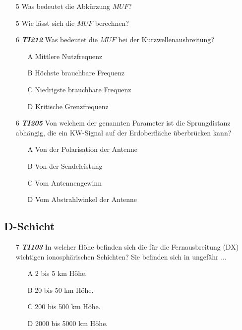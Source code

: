 \begin{enumerate} 
\itemsep1pt\parskip0pt
\item[5] Was bedeutet die Abkürzung $MUF$? 
\item[5] Wie lässt sich die $MUF$ berechnen? 
\item[6] \emph{\textbf{TI212}}   Was bedeutet die $MUF$ bei der Kurzwellenausbreitung?
	\begin{enumerate}
	\itemsep1pt\parskip0pt
		\item[A] Mittlere Nutzfrequenz
		\item[B] Höchste brauchbare Frequenz
		\item[C] Niedrigste brauchbare Frequenz
		\item[D] Kritische Grenzfrequenz
	\end{enumerate}
\end{enumerate}

\begin{enumerate} 
\itemsep1pt\parskip0pt
\item[6] \emph{\textbf{TI205}}   Von welchem der genannten Parameter ist die Sprungdistanz abhängig, die ein KW-Signal auf der Erdoberfläche überbrücken kann?
	\begin{enumerate}
	\itemsep1pt\parskip0pt
		\item[A] Von der Polarisation der Antenne
		\item[B] Von der Sendeleistung
		\item[C] Vom Antennengewinn
		\item[D] Vom Abstrahlwinkel der Antenne
	\end{enumerate}
\end{enumerate}

\subsection*{D-Schicht}

\begin{enumerate} 
\itemsep1pt\parskip0pt
\item[7] \emph{\textbf{TI103}}    In welcher Höhe befinden sich die für die Fernausbreitung (DX) wichtigen ionosphärischen Schichten? Sie befinden sich in ungefähr ...
	\begin{enumerate}
	\itemsep1pt\parskip0pt
		\item[A] 2 bis 5 km Höhe.
		\item[B] 20 bis 50 km Höhe.
		\item[C] 200 bis 500 km Höhe.
		\item[D] 2000 bis 5000 km Höhe.
	\end{enumerate}
\end{enumerate}

